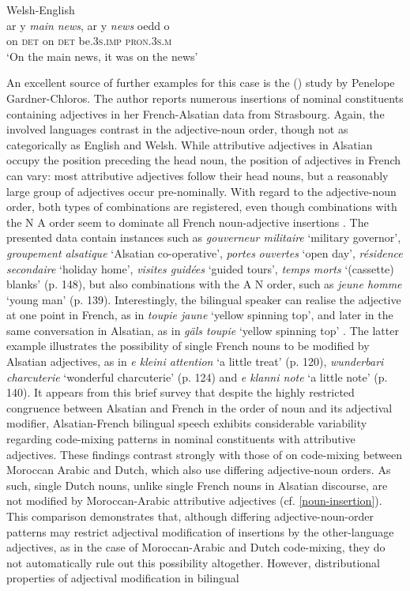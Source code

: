 \ea{\label{ex:4:7}}
Welsh-English \citep[261]{deuchar-congruence-2005}\\
\gll ar y \textit{main} \textit{news}, ar y \textit{news} oedd o\\
	on \textsc{det} {} {} on \textsc{det} {} be.\textsc{3s.imp} \textsc{pron.3s.m}\\
\glt `On the main news, it was on the news'
\z

An excellent source of further examples for this case is the (\citeyear{gardner-chloros-1991}) study by Penelope Gardner-Chloros. The author reports numerous insertions of nominal constituents containing adjectives in her French-Alsatian data from Strasbourg. Again, the involved languages contrast in the adjective-noun order, though not as categorically as English and Welsh. While attributive adjectives in Alsatian occupy the position preceding the head noun, the position of adjectives in French can vary: most attributive adjectives follow their head nouns, but a reasonably large group of adjectives occur pre-nominally. With regard to the adjective-noun order, both types of combinations are registered, even though combinations with the N A order seem to dominate all French noun-adjective insertions  \citep[cf.][141]{gardner-chloros-1991}. The presented data contain instances such as \textit{gouverneur militaire} `military governor', \textit{groupement alsatique} `Alsatian co-operative', \textit{portes} \textit{ouvertes} `open day', \textit{résidence secondaire} `holiday home', \textit{visites guidées} `guided tours', \textit{temps morts} `(cassette) blanks' (p. 148), but also combinations with the A N order, such as \textit{jeune homme} `young man' (p. 139). Interestingly, the bilingual speaker can realise the adjective at one point in French, as in \textit{toupie jaune} `yellow spinning top', and later in the same conversation in Alsatian, as in \textit{gäls toupie} `yellow spinning top' \citep[133]{gardner-chloros-1991}. The latter example illustrates the possibility of single French nouns to be modified by Alsatian adjectives, as in \textit{e kleini attention} `a little treat' (p. 120), \textit{wunderbari charcuterie} `wonderful charcuterie' (p. 124) and  \textit{e klanni note} `a little note' (p. 140). It appears from this brief survey that despite the highly restricted congruence between Alsatian and French in the order of noun and its adjectival modifier, Alsatian-French bilingual speech exhibits considerable variability regarding code-mixing patterns in nominal constituents with attributive adjectives. These findings contrast strongly with those of \citet{boumans-syntax-1998} on code-mixing between Moroccan Arabic and Dutch, which also use differing adjective-noun orders. As such, single Dutch nouns, unlike single French nouns in Alsatian discourse, are not modified by Moroccan-Arabic attributive adjectives (cf. \ref{noun-insertion}). This comparison demonstrates that, although differing adjective-noun-order patterns may restrict adjectival modification of insertions by the other-language adjectives, as in the case of Moroccan-Arabic and Dutch code-mixing, they do not automatically rule out this possibility altogether. However, distributional properties of adjectival modification in bilingual 